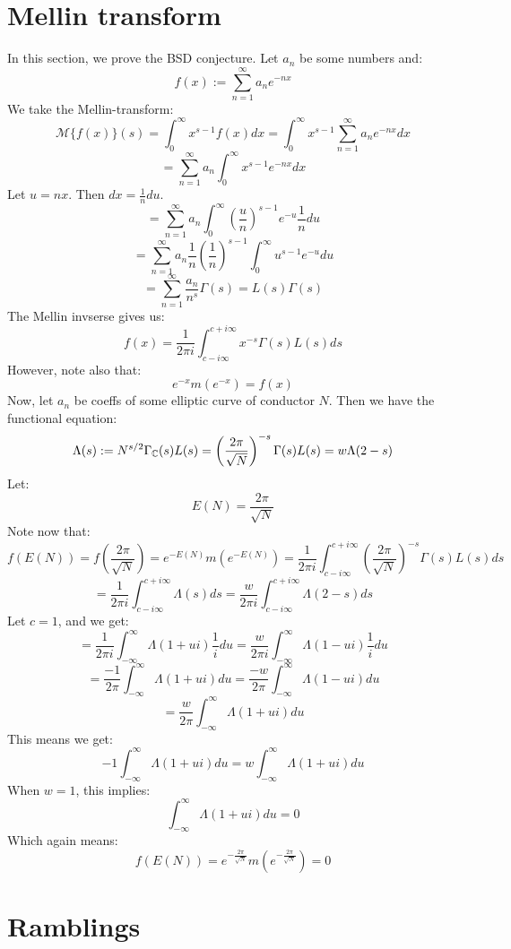 \documentclass[a4paper]{amsart}
\begin{document}
\section{Mellin transform}
In this section, we prove the BSD conjecture. Let $a_n$ be some numbers and:
$$f(x) := \sum_{n = 1}^\infty a_n e^{-nx}$$
We take the Mellin-transform: 
$$\mathcal{M}\{f(x)\}(s) = \int_0^\infty x^{s - 1} f(x) dx = \int_0^\infty x^{s - 1} \sum_{n = 1}^\infty a_n e^{-nx} dx$$
$$ = \sum_{n = 1}^\infty a_n \int_0^\infty x^{s - 1} e^{-nx} dx$$
Let $u = nx$. Then $dx = \frac{1}{n} du$.
$$ = \sum_{n = 1}^\infty a_n \int_0^\infty \left(\frac{u}{n}\right)^{s - 1} e^{-u} \frac{1}{n} du$$
$$ = \sum_{n = 1}^\infty a_n \frac{1}{n} \left(\frac{1}{n}\right)^{s - 1} \int_0^\infty u^{s - 1} e^{-u} du$$
$$ = \sum_{n = 1}^\infty \frac{a_n}{n^s} \Gamma(s) = L(s) \Gamma(s)$$
The Mellin invserse gives us: 
$$f(x) = \frac{1}{2\pi i}\int_{c - i \infty}^{c + i \infty} x^{-s} \Gamma(s) L(s)ds$$
However, note also that:
$$e^{-x}m(e^{-x}) = f(x)$$
Now, let $a_n$ be coeffs of some elliptic curve of conductor $N$. Then we have the functional equation:
$$\Lambda(s) := N^{s/2} \Gamma_{\mathbb{C}}(s) L(s) = \left(\frac{2\pi}{\sqrt{N}}\right)^{-s} \Gamma(s) L(s) = w\Lambda(2 - s)$$
Let:
$$E(N) = \frac{2\pi}{\sqrt{N}}$$
Note now that:
$$ f(E(N)) = f\left(\frac{2\pi}{\sqrt{N}}\right) = e^{-E(N)} m\left(e^{-E(N)}\right) = \frac{1}{2\pi i} \int_{c - i \infty}^{c + i \infty} \left(\frac{2\pi}{\sqrt{N}}\right)^{-s} \Gamma(s) L(s)ds$$
$$ = \frac{1}{2\pi i} \int_{c - i \infty}^{c + i \infty} \Lambda(s) ds = \frac{w}{2\pi i}\int_{c - i \infty}^{c + i \infty} \Lambda(2 - s) ds$$
Let $c = 1$,  and we get:
$$ = \frac{1}{2\pi i} \int_{-\infty}^{\infty} \Lambda(1 + ui) \frac{1}{i}du = \frac{w}{2\pi i}\int_{-\infty}^{\infty} \Lambda(1 - ui) \frac{1}{i}du$$
$$ = \frac{-1}{2\pi} \int_{-\infty}^{\infty} \Lambda(1 + ui) du = \frac{-w}{2\pi}\int_{-\infty}^{\infty} \Lambda(1 - ui) du$$
$$ = \frac{w}{2\pi}\int_{-\infty}^{\infty} \Lambda(1 + ui) du$$
This means we get:
$$-1 \int_{-\infty}^{\infty} \Lambda(1 + ui) du = w\int_{-\infty}^{\infty} \Lambda(1 + ui) du$$
When $w = 1$, this implies:
$$\int_{-\infty}^{\infty} \Lambda(1 + ui) du = 0$$
Which again means: 
$$f(E(N)) = e^{-\frac{2\pi}{\sqrt{N}}} m\left(e^{-\frac{2\pi}{\sqrt{N}}}\right) = 0$$


\section{Ramblings}
\end{document}
